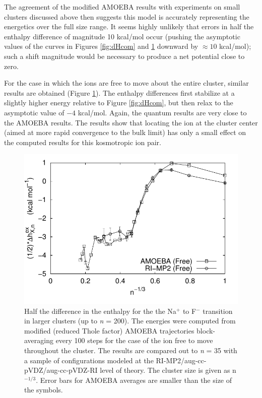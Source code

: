 \begin{cpa}
  The agreement of the modified AMOEBA results with experiments on small clusters discussed above then suggests this model is accurately representing the energetics
  over the full size range. It seems highly unlikely that errors in half the enthalpy difference of magnitude 10 kcal/mol occur (pushing the asymptotic values of the
  curves in Figures \ref{fig:dHcom} and \ref{fig:dHfree} downward by $\approx 10$ kcal/mol); such a shift magnitude would be necessary to produce a net potential 
  close to zero. 

  For the case in which the ions are free to move about the entire cluster, similar results are obtained (Figure \ref{fig:dHfree}). The enthalpy differences first
  stabilize at a slightly higher energy relative to Figure \ref{fig:dHcom}, but then relax to the asymptotic value of $-4$ kcal/mol. Again, the quantum results are 
  very close to the AMOEBA results.  The results show that locating the ion at the cluster center (aimed at more rapid convergence to the bulk limit) has only a 
  small effect on the computed results for this kosmotropic ion pair.  

\begin{figure}
 \begin{center}
  \includegraphics[width=0.98\linewidth]{images/cpa/deltaH_free-eps-converted-to.pdf}
 \end{center}
\caption[Half the enthalpy differences in the Na\sur{+}$\rightarrow$F\sur{-} transition for clusters with the ion unconstrained]{Half the difference in the enthalpy 
for the the Na$^+$ to F$^-$ transition in larger clusters (up to \emph{n} = 200). The energies were computed from modified (reduced Thole factor) AMOEBA trajectories
block-averaging every 100 steps for the case of the ion free to move throughout the cluster. The results are compared out to \emph{n} = 35 with a sample of configurations
modeled at the RI-MP2/aug-cc-pVDZ/aug-cc-pVDZ-RI level of theory. The cluster size is given as n$^{-1/3}$. Error bars for AMOEBA averages are smaller than the size of
the symbols.}
\label{fig:dHfree}
\end{figure}


\end{cpa}
